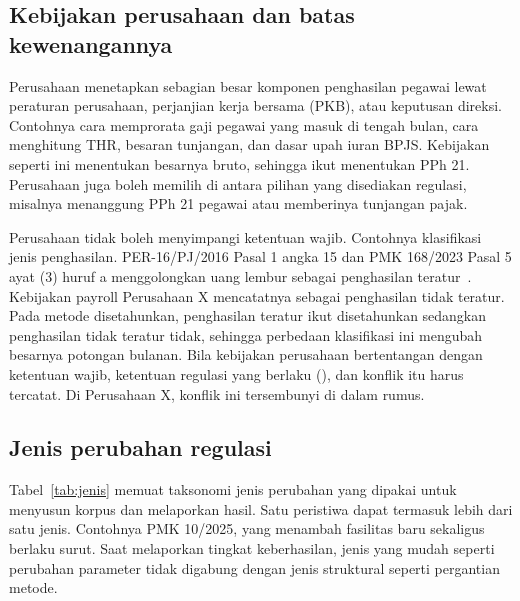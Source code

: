
\subsection{Kebijakan perusahaan dan batas kewenangannya}
\label{subsec:kebijakan}

Perusahaan menetapkan sebagian besar komponen penghasilan pegawai lewat peraturan perusahaan, perjanjian kerja bersama (PKB), atau keputusan direksi. Contohnya cara memprorata gaji pegawai yang masuk di tengah bulan, cara menghitung THR, besaran tunjangan, dan dasar upah iuran BPJS. Kebijakan seperti ini menentukan besarnya bruto, sehingga ikut menentukan PPh 21. Perusahaan juga boleh memilih di antara pilihan yang disediakan regulasi, misalnya menanggung PPh 21 pegawai atau memberinya tunjangan pajak.

Perusahaan tidak boleh menyimpangi ketentuan wajib. Contohnya klasifikasi jenis penghasilan. PER-16/PJ/2016 Pasal 1 angka 15 dan PMK 168/2023 Pasal 5 ayat (3) huruf a menggolongkan uang lembur sebagai penghasilan teratur~\cite{per16_2016,pmk168_2023}. Kebijakan payroll Perusahaan X mencatatnya sebagai penghasilan tidak teratur. Pada metode disetahunkan, penghasilan teratur ikut disetahunkan sedangkan penghasilan tidak teratur tidak, sehingga perbedaan klasifikasi ini mengubah besarnya potongan bulanan. Bila kebijakan perusahaan bertentangan dengan ketentuan wajib, ketentuan regulasi yang berlaku (), dan konflik itu harus tercatat. Di  Perusahaan X, konflik ini tersembunyi di dalam rumus.

\subsection{Jenis perubahan regulasi}
\label{subsec:jenis-perubahan}

Tabel~\ref{tab:jenis} memuat taksonomi jenis perubahan yang dipakai untuk menyusun korpus dan melaporkan hasil. Satu peristiwa dapat termasuk lebih dari satu jenis. Contohnya PMK 10/2025, yang menambah fasilitas baru sekaligus berlaku surut. Saat melaporkan tingkat keberhasilan, jenis yang mudah seperti perubahan parameter tidak digabung dengan jenis struktural seperti pergantian metode.

